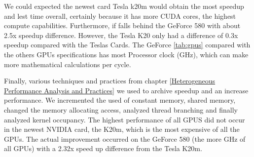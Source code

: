 We could expected the newest card Tesla k20m would obtain the most speedup and lest time overall, certainly because it has more CUDA cores, the highest compute capabilities. Furthermore, if falls behind the GeForce 580 with about 2.5x speedup difference. However, the Tesla K20 only had a difference of 0.3x speedup compared with the Teslas Cards. The GeForce \ref{tab:gpus} compared with the others GPUs specifications has most Processor clock (GHz), which can make more mathematical calculations per cycle.

  \vspace{3.5em}

Finally, various techniques and practices from chapter \ref{Heterogeneous Performance Analysis and Practices} we used to archive speedup and an increase performance. We incremented the used of constant memory, shared memory, changed the memory allocating access, analyzed thread branching and finally analyzed kernel occupancy. The highest performance of all GPUS did not occur in the newest NVIDIA card, the K20m, which is the most expensive of all the GPUs. The actual improvement occurred on the GeForce 580 (the more GHz of all GPUs) with a 2.32x speed up difference from the Tesla K20m.
  
